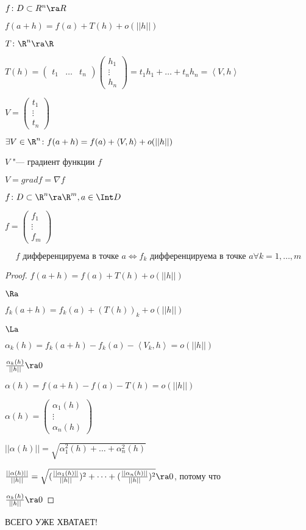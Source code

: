 $f \colon D \subset R^n \ra R$

$f(a + h) = f(a) + T(h) + o(||h||)$

$T \colon \R^n \ra \R$

$T(h) = 
\begin{pmatrix}
t_1 & \dots & t_n
\end{pmatrix}
\begin{pmatrix}
h_1\\
\vdots \\
h_n
\end{pmatrix} = t_1h_1 + \dots + t_nh_n = \left< V, h \right>$

$V = 
\begin{pmatrix}
t_1\\
\vdots \\
t_n
\end{pmatrix}$

$\exists V \in \R^n \colon f(a + h) = f(a) + \left< V, h \right> + o(||h||)$

\begin{Def}
$V$ "--- градиент функции $f$

$V = grad f = \nabla f$
\end{Def}

\begin{theorem}
$f \colon D \subset \R^n \ra \R^m, a \in \Int D$

$f = 
\begin{pmatrix}
f_1\\
\vdots\\
f_m
\end{pmatrix}$

\[f \text{ дифференцируема в точке } a \Leftrightarrow f_k \text{ дифференцируема в точке } a \forall k = 1, \dots, m\]
\end{theorem} 

\begin{proof}
$f(a + h) = f(a) + T(h) + o(||h||)$

$\Ra$

$f_k(a + h) = f_k(a) + (T(h))_k + o(||h||)$

$\La$

$\alpha_k(h) = f_k(a+h) - f_k(a) - \left<V_k, h\right> = o(||h||)$

$\frac{\alpha_k(h)}{||h||} \ra 0$

$\alpha(h) = f(a+h) - f(a) - T(h) = o(||h||)$

$\alpha(h) = 
\begin{pmatrix}
\alpha_1(h)\\
\vdots\\
\alpha_n(h)
\end{pmatrix}$

$||\alpha(h)|| = \sqrt{\alpha_1^2(h) +\dots + \alpha_n^2(h)}$

$\frac{||\alpha(h)||}{||h||} = \sqrt{(\frac{||\alpha_1(h)||}{||h||}) ^ 2 + \dots + (\frac{||\alpha_n(h)||}{||h||}) ^ 2} \ra 0$, потому что

$\frac{\alpha_k(h)}{||h||} \ra 0$
\end{proof}
{\LARGE ВСЕГО УЖЕ ХВАТАЕТ!}

